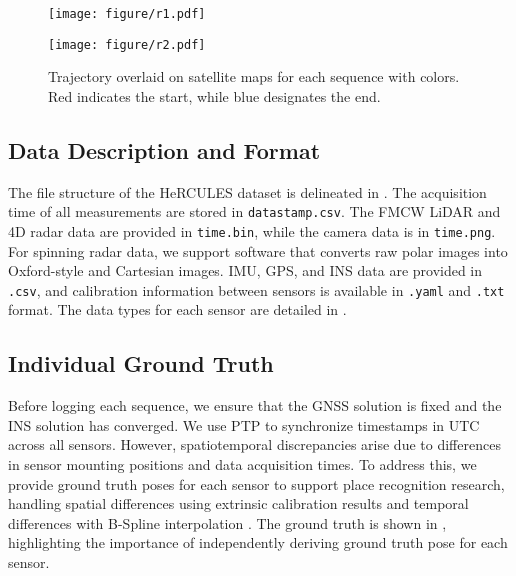 \begin{figure}[!t] %
    \centering
    \texttt{[image: figure/r1.pdf]} %
    \vspace{-7mm}
\end{figure}


\begin{figure}[!t] %
    \centering
    \texttt{[image: figure/r2.pdf]} %
    \caption{Trajectory overlaid on satellite maps for each sequence with colors. Red indicates the start, while blue designates the end.}
    \label{fig:road}
    \vspace{-6mm}
\end{figure}


\subsection{Data Description and Format}

The file structure of the HeRCULES dataset is delineated in . The acquisition time of
all measurements are stored in \texttt{datastamp.csv}. The FMCW LiDAR and 4D radar data are provided in \texttt{time.bin}, while the camera data is in \texttt{time.png}. For spinning radar data, we support software that converts raw polar images into Oxford-style \cite{barnes2020oxford} and Cartesian images. \ac{IMU}, \ac{GPS}, and \ac{INS} data are provided in \texttt{.csv}, and calibration information between sensors is available in \texttt{.yaml} and \texttt{.txt} format. The data types for each sensor are detailed in .

\subsection{Individual Ground Truth}
Before logging each sequence, we ensure that the GNSS solution is fixed and the INS solution has converged. We use \ac{PTP} to synchronize timestamps in \ac{UTC} across all sensors. However, spatiotemporal discrepancies arise due to differences in sensor mounting positions and data acquisition times.
To address this, we provide ground truth poses for each sensor to support place recognition research, handling spatial differences using extrinsic calibration results and temporal differences with B-Spline interpolation \cite{mueggler2018continuous}.
The ground truth is shown in , highlighting the importance of independently deriving ground truth pose for each sensor.

